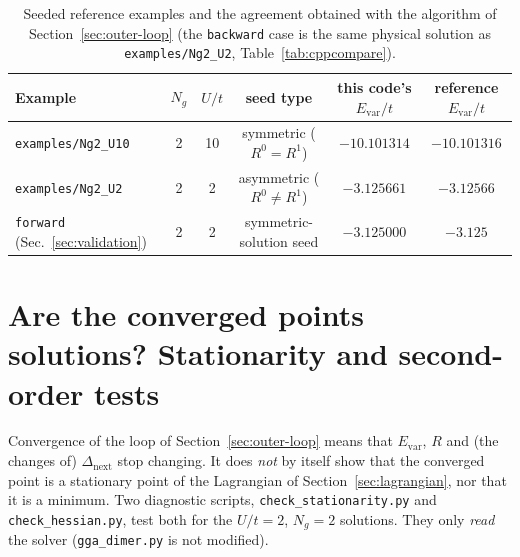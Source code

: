 \documentclass[11pt]{article}
\newcommand{\Ng}{N_{g}}
\begin{document}
\begin{table}[h]
\centering
\begin{tabular}{lccccc}
\toprule
Example & $\Ng$ & $U/t$ & seed type & this code's $E_{\mathrm{var}}/t$ & reference $E_{\mathrm{var}}/t$ \\
\midrule
\texttt{examples/Ng2\_U10} & 2 & 10 & symmetric ($R^0{=}R^1$) & $-10.101314$ & $-10.101316$ \\
\texttt{examples/Ng2\_U2}  & 2 & 2  & asymmetric ($R^0{\neq}R^1$) & $-3.125661$ & $-3.12566$ \\
\texttt{forward} (Sec.~\ref{sec:validation})  & 2 & 2  & symmetric-solution seed & $-3.125000$ & $-3.125$ \\
\bottomrule
\end{tabular}
\caption{Seeded reference examples and the agreement obtained with the
algorithm of Section~\ref{sec:outer-loop} (the \texttt{backward} case is
the same physical solution as \texttt{examples/Ng2\_U2}, Table~\ref{tab:cppcompare}).}
\label{tab:examples}
\end{table}

\section{Are the converged points solutions? Stationarity and second-order tests}
\label{sec:stationarity}

Convergence of the loop of Section~\ref{sec:outer-loop} means that $E_{\mathrm{var}}$, $R$
and (the changes of) $\Delta_{\mathrm{next}}$ stop changing. It does \emph{not} by itself
show that the converged point is a stationary point of the Lagrangian
of Section~\ref{sec:lagrangian}, nor that it is a minimum. Two diagnostic
scripts, \texttt{check\_stationarity.py} and \texttt{check\_hessian.py}, test both
for the $U/t=2$, $\Ng=2$ solutions. They only \emph{read} the solver
(\texttt{gga\_dimer.py} is not modified).
\end{document}
